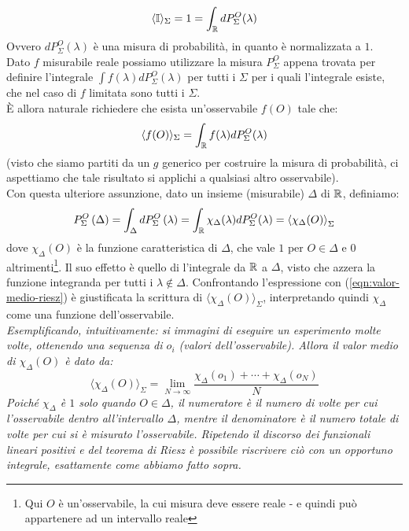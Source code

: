 \documentclass[FisicaTeorica.tex]{subfiles}
\begin{document}
\[
\langle \mathbb{I}\rangle_\Sigma = 1 = \int_{\mathbb{R}} dP_\Sigma^O (\lambda)
\]
Ovvero $dP_\Sigma^O\left(\lambda\right)$ è una misura di probabilità, in quanto è normalizzata a $1$.\\%
Dato $f$ misurabile reale possiamo utilizzare la misura $P_\Sigma^O$ appena trovata per definire l'integrale
$\int f\left(\lambda\right) dP_\Sigma^O(\lambda)$ per tutti i $\Sigma$ per i quali l'integrale esiste, che nel caso di $f$ limitata sono tutti i $\Sigma$.\\
È allora naturale richiedere che esista un'osservabile $f(O)$ tale che: %
\[
\langle f(O)\rangle_\Sigma = \int_{\mathbb{R}} f(\lambda) dP_\Sigma^O(\lambda)
\]
(visto che siamo partiti da un $g$ generico per costruire la misura di probabilità, ci aspettiamo che tale risultato si applichi a qualsiasi altro osservabile).\\
Con questa ulteriore assunzione, dato un insieme (misurabile) $\Delta$ di $\mathbb{R}$, definiamo:
\[P_\Sigma^O\left(\Delta\right)= \int_{\Delta}{dP_\Sigma^O\left(\lambda\right)=
\int_{\mathbb{R}} \chi_\Delta(\lambda) dP_\Sigma^O(\lambda) = 
\left\langle\chi_\Delta(O)\right\rangle_\Sigma}
\] 
dove $\chi_\Delta(O)$ è la funzione caratteristica di $\Delta$, che vale $1$ per $O \in \Delta$ e $0$ altrimenti\footnote{Qui $O$ è un'osservabile, la cui misura deve essere reale - e quindi può appartenere ad un intervallo reale}. Il suo effetto è quello di  l'integrale da $\mathbb{R}$ a $\Delta$, visto che azzera la funzione integranda per tutti i $\lambda \notin \Delta$. Confrontando l'espressione con (\ref{eqn:valor-medio-riesz}) è giustificata la scrittura di $\langle \chi_\Delta(O)\rangle_\Sigma$, interpretando quindi $\chi_\Delta$ come una funzione dell'osservabile.\\
\textit{Esemplificando, intuitivamente: si immagini di eseguire un esperimento molte volte, ottenendo una sequenza di $o_i$ (valori dell'osservabile). Allora il valor medio di $\chi_\Delta(O)$ è dato da:}
\[
\langle \chi_\Delta(O)\rangle_\Sigma = \lim_{N\to \infty} \frac{\chi_\Delta(o_1) + \cdots + \chi_\Delta(o_N)}{N}
\]
\textit{Poiché $\chi_\Delta$ è $1$ solo quando $O \in \Delta$, il numeratore è il numero di volte per cui l'osservabile  dentro all'intervallo $\Delta$, mentre il denominatore è il numero totale di volte per cui si è misurato l'osservabile. Ripetendo il discorso dei funzionali lineari positivi e del teorema di Riesz è possibile riscrivere ciò con un opportuno integrale, esattamente come abbiamo fatto sopra.}\\
\end{document}
